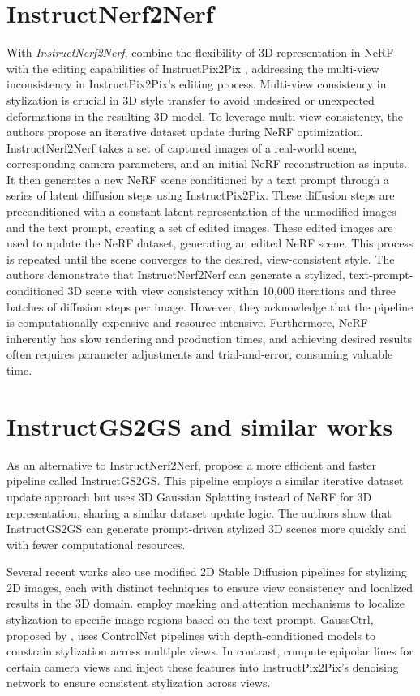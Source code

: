 \section{InstructNerf2Nerf}
With \textit{InstructNerf2Nerf}, \textcite{Haque.2023} combine the flexibility of 3D representation in NeRF with the editing capabilities of InstructPix2Pix \citep{Brooks.2023}, addressing the multi-view inconsistency in InstructPix2Pix's editing process. Multi-view consistency in stylization is crucial in 3D style transfer to avoid undesired or unexpected deformations in the resulting 3D model. To leverage multi-view consistency, the authors propose an iterative dataset update during NeRF optimization. 
InstructNerf2Nerf takes a set of captured images of a real-world scene, corresponding camera parameters, and an initial NeRF reconstruction as inputs. It then generates a new NeRF scene conditioned by a text prompt through a series of latent diffusion steps using InstructPix2Pix. These diffusion steps are preconditioned with a constant latent representation of the unmodified images and the text prompt, creating a set of edited images. These edited images are used to update the NeRF dataset, generating an edited NeRF scene. This process is repeated until the scene converges to the desired, view-consistent style. The authors demonstrate that InstructNerf2Nerf can generate a stylized, text-prompt-conditioned 3D scene with view consistency within 10,000 iterations and three batches of diffusion steps per image. However, they acknowledge that the pipeline is computationally expensive and resource-intensive. Furthermore, NeRF inherently has slow rendering and production times, and achieving desired results often requires parameter adjustments and trial-and-error, consuming valuable time.


\section{InstructGS2GS and similar works}
As an alternative to InstructNerf2Nerf, \textcite{Vachha.2024} propose a more efficient and faster pipeline called InstructGS2GS. This pipeline employs a similar iterative dataset update approach but uses 3D Gaussian Splatting \citep{Kerbl.2023} instead of NeRF for 3D representation, sharing a similar dataset update logic. The authors show that InstructGS2GS can generate prompt-driven stylized 3D scenes more quickly and with fewer computational resources.

Several recent works \citep{Wang.2024, Wu.2024, Chen.2024, Chen.2023a, Jaganathan.2024} also use modified 2D Stable Diffusion pipelines for stylizing 2D images, each with distinct techniques to ensure view consistency and localized results in the 3D domain. \textcite{Wu.2024, Chen.2024} employ masking and attention mechanisms to localize stylization to specific image regions based on the text prompt. GaussCtrl, proposed by \textcite{Wu.2024}, uses ControlNet pipelines with depth-conditioned models to constrain stylization across multiple views. In contrast, \textcite{Chen.2024} compute epipolar lines for certain camera views and inject these features into InstructPix2Pix’s denoising network to ensure consistent stylization across views.

